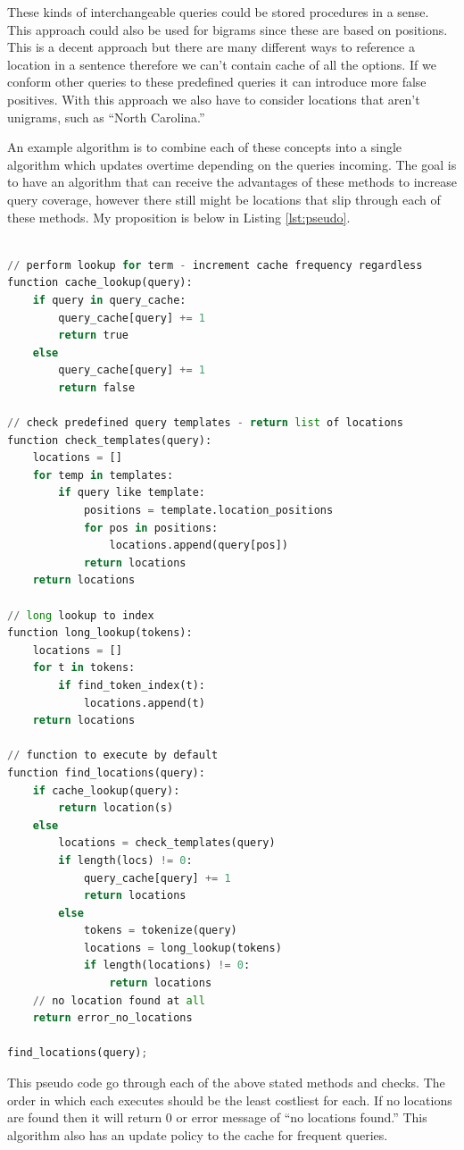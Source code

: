 \documentclass[letterpaper,11pt]{article}
\begin{document}
These kinds of interchangeable queries could be stored procedures in a sense.
This approach could also be used for bigrams since these are based on positions.
This is a decent approach but there are many different ways to reference a location in a sentence therefore we can't contain cache of all the options.
If we conform other queries to these predefined queries it can introduce more false positives.
With this approach we also have to consider locations that aren't unigrams, such as ``North Carolina.''

An example algorithm is to combine each of these concepts into a single algorithm which updates overtime depending on the queries incoming.
The goal is to have an algorithm that can receive the advantages of these methods to increase query coverage, however there still might be locations that slip through each of these methods. My proposition is below in Listing \ref{lst:pseudo}.

\begin{lstlisting}[language=python, caption={Pseudo code algorithm for Location detection in queries}, label={lst:pseudo}]

// perform lookup for term - increment cache frequency regardless
function cache_lookup(query):
	if query in query_cache:
		query_cache[query] += 1
		return true
	else
		query_cache[query] += 1
		return false

// check predefined query templates - return list of locations
function check_templates(query):
	locations = []
	for temp in templates:
		if query like template:
			positions = template.location_positions
			for pos in positions:
				locations.append(query[pos])
			return locations
	return locations

// long lookup to index
function long_lookup(tokens):
	locations = []
	for t in tokens:
		if find_token_index(t):
			locations.append(t)
	return locations			
	
// function to execute by default
function find_locations(query):
	if cache_lookup(query):
		return location(s)
	else
		locations = check_templates(query)
		if length(locs) != 0:
			query_cache[query] += 1
			return locations
		else
			tokens = tokenize(query)
			locations = long_lookup(tokens)
			if length(locations) != 0:
				return locations
	// no location found at all
	return error_no_locations

find_locations(query);
\end{lstlisting}

This pseudo code go through each of the above stated methods and checks.
The order in which each executes should be the least costliest for each.
If no locations are found then it will return 0 or error message of ``no locations found.''
This algorithm also has an update policy to the cache for frequent queries.
\end{document}
